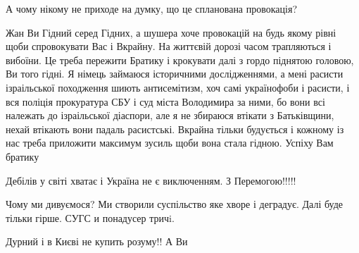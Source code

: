 \begin{itemize}
А чому нікому не приходе на думку, що це спланована провокація?

 

Жан Ви Гідний серед Гідних, а шушера хоче провокацій на будь якому рівні щоби
спровокувати Вас і Вкрайну. На життєвій дорозі часом трапляються і вибоїни. Це
треба пережити Братику і крокувати далі з гордо піднятою головою, Ви того
гідні. Я німець займаюся історичними дослідженнями, а мені расисти ізраільської
походження шиють антисемітизм, хоч самі українофоби і расисти, і вся поліція
прокуратура СБУ і суд міста Володимира за ними, бо вони всі належать до
ізраільської діаспори, але я не збираюся втікати з Батьківщини, нехай втікають
вони падаль расистські. Вкрайна тільки будується і кожному із нас треба
приложити максимум зусиль щоби вона стала гідною. Успіху Вам братику

 
Дебілів у світі хватає і Україна не є виключенням. З Перемогою!!!!!

 
Чому ми дивуємося? Ми створили суспільство яке хворе і деградує. Далі буде тільки гірше. СУГС и понадусер тричi.

 
Дурний і в Києві не купить розуму!!
А Ви 💪🇺🇦

 

\end{itemize}
